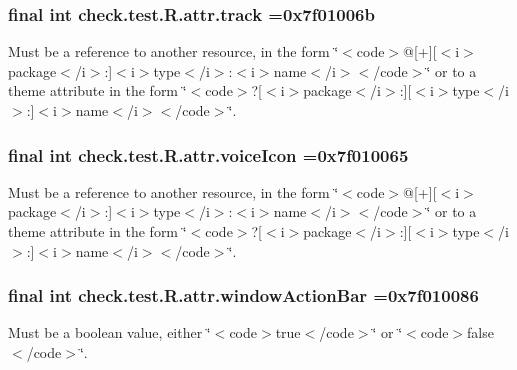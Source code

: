 \subsubsection[{track}]{\setlength{\rightskip}{0pt plus 5cm}final int check.\+test.\+R.\+attr.\+track =0x7f01006b\hspace{0.3cm}{\ttfamily [static]}}\label{classcheck_1_1test_1_1_r_1_1attr_a96007b76e63444b819a9c38ff1451df1}
Must be a reference to another resource, in the form \char`\"{}$<$code$>$@\mbox{[}+\mbox{]}\mbox{[}$<$i$>$package$<$/i$>$\+:\mbox{]}$<$i$>$type$<$/i$>$\+:$<$i$>$name$<$/i$>$$<$/code$>$\char`\"{} or to a theme attribute in the form \char`\"{}$<$code$>$?\mbox{[}$<$i$>$package$<$/i$>$\+:\mbox{]}\mbox{[}$<$i$>$type$<$/i$>$\+:\mbox{]}$<$i$>$name$<$/i$>$$<$/code$>$\char`\"{}. \hypertarget{classcheck_1_1test_1_1_r_1_1attr_acbef98ffd0298aff57e4df6b3265f2f5}{}
\subsubsection[{voice\+Icon}]{\setlength{\rightskip}{0pt plus 5cm}final int check.\+test.\+R.\+attr.\+voice\+Icon =0x7f010065\hspace{0.3cm}{\ttfamily [static]}}\label{classcheck_1_1test_1_1_r_1_1attr_acbef98ffd0298aff57e4df6b3265f2f5}
Must be a reference to another resource, in the form \char`\"{}$<$code$>$@\mbox{[}+\mbox{]}\mbox{[}$<$i$>$package$<$/i$>$\+:\mbox{]}$<$i$>$type$<$/i$>$\+:$<$i$>$name$<$/i$>$$<$/code$>$\char`\"{} or to a theme attribute in the form \char`\"{}$<$code$>$?\mbox{[}$<$i$>$package$<$/i$>$\+:\mbox{]}\mbox{[}$<$i$>$type$<$/i$>$\+:\mbox{]}$<$i$>$name$<$/i$>$$<$/code$>$\char`\"{}. \hypertarget{classcheck_1_1test_1_1_r_1_1attr_a8acf10ee7b5c99830207704fc5046ebd}{}
\subsubsection[{window\+Action\+Bar}]{\setlength{\rightskip}{0pt plus 5cm}final int check.\+test.\+R.\+attr.\+window\+Action\+Bar =0x7f010086\hspace{0.3cm}{\ttfamily [static]}}\label{classcheck_1_1test_1_1_r_1_1attr_a8acf10ee7b5c99830207704fc5046ebd}
Must be a boolean value, either \char`\"{}$<$code$>$true$<$/code$>$\char`\"{} or \char`\"{}$<$code$>$false$<$/code$>$\char`\"{}. 

